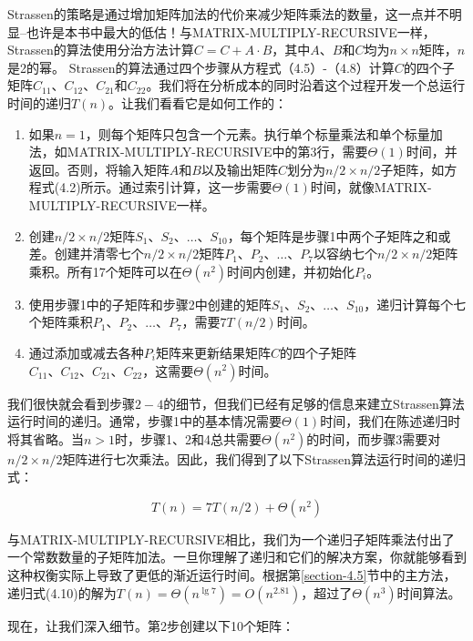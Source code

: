 \documentclass[lang=cn,newtx,10pt,scheme=chinese]{elegantbook}
\begin{document}
Strassen的策略是通过增加矩阵加法的代价来减少矩阵乘法的数量，这一点并不明显--也许是本书中最大的低估！与MATRIX-MULTIPLY-RECURSIVE一样，Strassen的算法使用分治方法计算$C=C+A \cdot B$，其中$A、B$和$C$均为$n \times n$矩阵，$n$是2的幂。 Strassen的算法通过四个步骤从方程式（4.5）-（4.8）计算$C$的四个子矩阵$C_{11}、C_{12}、C_{21}$和$C_{22}$。我们将在分析成本的同时沿着这个过程开发一个总运行时间的递归$T(n)$。让我们看看它是如何工作的：

\begin{enumerate}
\item 如果$n=1$，则每个矩阵只包含一个元素。执行单个标量乘法和单个标量加法，如MATRIX-MULTIPLY-RECURSIVE中的第3行，需要$\Theta(1)$时间，并返回。否则，将输入矩阵$A$和$B$以及输出矩阵$C$划分为$n/2\times n/2$子矩阵，如方程式(4.2)所示。通过索引计算，这一步需要$\Theta(1)$时间，就像MATRIX-MULTIPLY-RECURSIVE一样。
\item 创建$n/2\times n/2$矩阵$S_1、S_2、\ldots、S_{10}$，每个矩阵是步骤1中两个子矩阵之和或差。创建并清零七个$n/2\times n/2$矩阵$P_1、P_2、\ldots、P_7$以容纳七个$n/2\times n/2$矩阵乘积。所有17个矩阵可以在$\Theta\left(n^2\right)$时间内创建，并初始化$P_i$。
\item 使用步骤1中的子矩阵和步骤2中创建的矩阵$S_1、S_2、\ldots、S_{10}$，递归计算每个七个矩阵乘积$P_1、P_2、\ldots、P_7$，需要$7T(n/2)$时间。
\item 通过添加或减去各种$P_i$矩阵来更新结果矩阵$C$的四个子矩阵$C_{11}、C_{12}、C_{21}、C_{22}$，这需要$\Theta\left(n^2\right)$时间。
\end{enumerate}

我们很快就会看到步骤$2-4$的细节，但我们已经有足够的信息来建立Strassen算法运行时间的递归。通常，步骤1中的基本情况需要$\Theta(1)$时间，我们在陈述递归时将其省略。当$n>1$时，步骤1、2和4总共需要$\Theta\left(n^2\right)$的时间，而步骤3需要对$n/2\times n/2$矩阵进行七次乘法。因此，我们得到了以下Strassen算法运行时间的递归式：

\begin{equation}
T(n)=7 T(n / 2)+\Theta\left(n^2\right)
\end{equation}

与MATRIX-MULTIPLY-RECURSIVE相比，我们为一个递归子矩阵乘法付出了一个常数数量的子矩阵加法。一旦你理解了递归和它们的解决方案，你就能够看到这种权衡实际上导致了更低的渐近运行时间。根据第\ref{section-4.5}节中的主方法，递归式(4.10)的解为$T(n)=\Theta\left(n^{\lg 7}\right)=O\left(n^{2.81}\right)$，超过了$\Theta\left(n^3\right)$时间算法。

现在，让我们深入细节。第2步创建以下10个矩阵：
\end{document}
